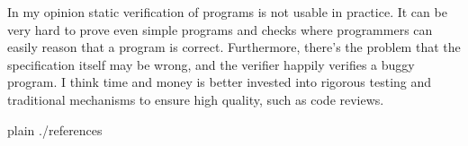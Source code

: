 \documentclass[a4paper,10pt]{article}
\begin{document}
In my opinion static verification of programs is not usable in practice.
It can be very hard to prove even simple programs and checks where programmers can easily reason that a program is correct.
Furthermore, there's the problem that the specification itself may be wrong, and the verifier happily verifies a buggy program.
I think time and money is better invested into rigorous testing and traditional mechanisms to ensure high quality, such as code reviews.

\todos

\begin{flushleft}
{{{
 {plain}
 {./references}
}}}
\end{flushleft}
\end{document}
